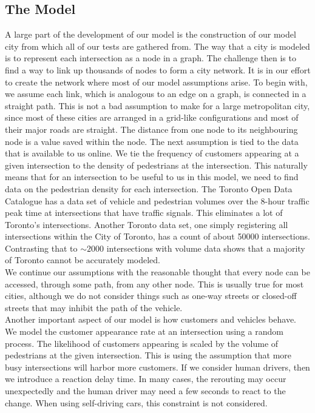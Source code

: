 \documentclass[Proceedings]{ascelike}
\begin{document}
\subsection*{The Model}

A large part of the development of our model is the construction of our model city from which all of our tests are gathered from. The way that a city is modeled is to represent each intersection as a node in a graph. The challenge then is to find a way to link up thousands of nodes to form a city network. It is in our effort to create the network where most of our model assumptions arise. To begin with, we assume each link, which is analogous to an edge on a graph, is connected in a straight path. This is not a bad assumption to make for a large metropolitan city, since most of these cities are arranged in a grid-like configurations and most of their major roads are straight. The distance from one node to its neighbouring node is a value saved within the node. The next assumption is tied to the data that is available to us online. We tie the frequency of customers appearing at a given intersection to the density of pedestrians at the intersection. This naturally means that for an intersection to be useful to us in this model, we need to find data on the pedestrian density for each intersection. The Toronto Open Data Catalogue has a data set of vehicle and pedestrian volumes over the 8-hour traffic peak time at intersections that have traffic signals\cite{TorontoTraffic}. This eliminates a lot of Toronto's intersections. Another Toronto data set, one simply registering all intersections within the City of Toronto\cite{TorontoIntersections}, has a count of about 50000 intersections. Contrasting that to $\sim2000$ intersections with volume data shows that a majority of Toronto cannot be accurately modeled. \\

We continue our assumptions with the reasonable thought that every node can be accessed, through some path, from any other node. This is usually true for most cities, although we do not consider things such as one-way streets or closed-off streets that may inhibit the path of the vehicle. \\

Another important aspect of our model is how customers and vehicles behave. We model the customer appearance rate at an intersection using a random process. The likelihood of customers appearing is scaled by the volume of pedestrians at the given intersection. This is using the assumption that more busy intersections will harbor more customers. If we consider human drivers, then we introduce a reaction delay time. In many cases, the rerouting may occur unexpectedly and the human driver may need a few seconds to react to the change. When using self-driving cars, this constraint is not considered. \\
\end{document}

